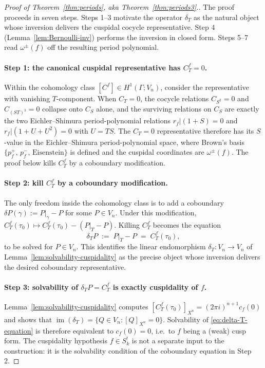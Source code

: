\documentclass[11pt]{article}
\numberwithin{equation}{section}  %
\begin{document}
\begin{proof}[Proof of Theorem~\ref{thm:periods}, aka Theorem~\ref{thm:periods3}.]
The proof proceeds in seven steps.  Steps 1--3 motivate the operator
$\delta_T$ as the natural object whose inversion delivers the cuspidal
cocycle representative.  Step 4 (Lemma~\ref{lem:Bernoulli-inv})
performs the inversion in closed form.  Steps 5--7 read $\omega^\pm(f)$
off the resulting period polynomial.

\paragraph{Step 1: the canonical cuspidal representative has $C^f_T = 0$.}
Within the cohomology class $[C^f] \in H^1(\Gamma; V_n)$, consider the
representative with vanishing $T$-component.  When $C_T = 0$, the
cocycle relations $C_{S^2} = 0$ and $C_{(ST)^3} = 0$ collapse onto
$C_S$ alone, and the surviving relations on $C_S$ are exactly the two
Eichler--Shimura period-polynomial relations $r_f|(1 + S) = 0$ and
$r_f|(1 + U + U^2) = 0$ with $U = TS$.  The $C_T = 0$ representative
therefore has its $S$-value in the Eichler--Shimura period-polynomial
space, where Brown's basis $\{p^+_f,\, p^-_f,\, \text{Eisenstein}\}$
is defined and the cuspidal coordinates are $\omega^\pm(f)$.  The
proof below kills $C^f_T$ by a coboundary modification.

\paragraph{Step 2: kill $C^f_T$ by a coboundary modification.}
The only freedom inside the cohomology class is to add a coboundary
$\delta P(\gamma) := P|_\gamma - P$ for some $P \in V_n$.  Under this
modification, $C^f_T(\tau_0) \mapsto C^f_T(\tau_0) - (P|_T - P)$.
Killing $C^f_T$ becomes the equation
\begin{equation}\label{eq:delta-T-equation}
  \delta_T P \;:=\; P|_T - P \;=\; C^f_T(\tau_0),
\end{equation}
to be solved for $P \in V_n$.  This identifies the linear endomorphism
$\delta_T \colon V_n \to V_n$ of Lemma~\ref{lem:solvability-cuspidality}
as the precise object whose inversion delivers the desired coboundary
representative.

\paragraph{Step 3: solvability of $\delta_T P = C^f_T$ is exactly cuspidality of $f$.}
Lemma~\ref{lem:solvability-cuspidality} computes $[C^f_T(\tau_0)]_{X^n}
= (2\pi i)^{n+1} c_f(0)$ and shows that $\operatorname{im}(\delta_T) = \{Q
\in V_n : [Q]_{X^n} = 0\}$.  Solvability of \eqref{eq:delta-T-equation}
is therefore equivalent to $c_f(0) = 0$, i.e.\ to $f$ being a (weak)
cusp form.  The cuspidality hypothesis $f \in S^!_k$ is not a separate
input to the construction: it 
is the solvability condition of the
coboundary equation in Step 2.


\end{proof}
\end{document}
